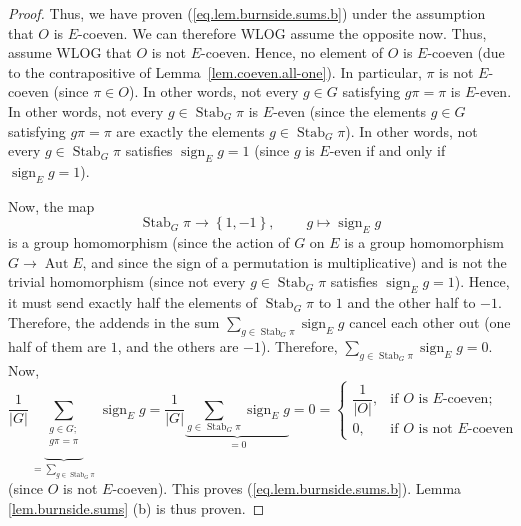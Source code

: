 \documentclass[12pt]{article}
\theoremstyle{plain}
\theoremstyle{definition}
\theoremstyle{remark}
\let\sumnonlimits\sum
\renewcommand{\sum}{\sumnonlimits\limits}
\newcommand{\sign}{\operatorname{sign}}
\newcommand{\Stab}{\operatorname{Stab}}
\begin{document}
\begin{proof}
Thus, we have proven (\ref{eq.lem.burnside.sums.b}) under the assumption that
$O$ is $E$-coeven. We can therefore WLOG assume the opposite now. Thus, assume
WLOG that $O$ is not $E$-coeven. Hence, no element of $O$ is
$E$-coeven (due to the contrapositive of Lemma~\ref{lem.coeven.all-one}).
In particular, $\pi$ is not $E$-coeven (since $\pi \in O$).
In other words, not every $g\in G$ satisfying $g\pi=\pi$ is
$E$-even. In other words, not every $g\in \Stab_G \pi$
is $E$-even (since the elements $g\in G$ satisfying $g\pi=\pi$ are exactly the
elements $g\in \Stab_G \pi$). In other words, not
every $g\in \Stab_G \pi$ satisfies
$\sign_E g = 1$ (since $g$ is $E$-even if and only if
$\sign_E g = 1$).

Now, the map
\[
 \Stab_G \pi\rightarrow\left\{  1,-1\right\}
,\ \ \ \ \ \ \ \ \ \ g \mapsto \sign_E g
\]
is a group homomorphism (since the action of $G$ on $E$ is a group
homomorphism $G \to \operatorname{Aut} E$, and since
the sign of a permutation is multiplicative)
and is not the trivial homomorphism (since not every
$g \in \Stab_G \pi$ satisfies $\sign_E g = 1$). Hence, it
must send exactly half the elements of $ \Stab_G \pi$
to $1$ and the other half to $-1$. Therefore, the addends in the sum
$\sum_{g\in \Stab_G \pi}
\sign_E g$ cancel each other out (one half of them are $1$, and the
others are $-1$). Therefore,
$\sum_{g\in \Stab_G \pi} \sign_E g = 0$. Now,
\[
\dfrac{1}{\left\vert G\right\vert }\underbrace{\sum_{\substack{g\in
G;\\g\pi=\pi}}}_{=\sum_{g\in \Stab_G \pi}}
\sign_E g
= \dfrac{1}{\left\vert G\right\vert }
\underbrace{\sum_{g\in \Stab_G \pi} \sign_E g}_{=0}
= 0
=
\begin{cases}
\dfrac{1}{\left\vert O\right\vert }, & \text{if }O\text{ is }E\text{-coeven}%
;\\
0, & \text{if }O\text{ is not }E\text{-coeven}%
\end{cases}
\]
(since $O$ is not $E$-coeven).
This proves (\ref{eq.lem.burnside.sums.b}). Lemma \ref{lem.burnside.sums} (b)
is thus proven.
\end{proof}
\end{document}
